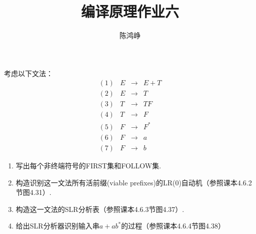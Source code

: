\documentclass[logo,reportComp]{thesis}
\title{编译原理作业六}
\subtitle{}
\author{陈鸿峥}
\begin{document}
\maketitle

\begin{question}
考虑以下文法：
\[\begin{array}{rrll}
(1) & E &\to & E+T\\
(2) & E &\to & T\\
(3) & T &\to & TF\\
(4) & T &\to & F\\
(5) & F &\to & F^*\\
(6) & F &\to & a\\
(7) & F &\to & b
\end{array}\]
\begin{enumerate}
	\item 写出每个非终端符号的FIRST集和FOLLOW集.
	\item 构造识别这一文法所有活前缀(viable prefixes)的LR(0)自动机（参照课本4.6.2节图4.31）.
	\item 构造这一文法的SLR分析表（参照课本4.6.3节图4.37）.
	\item 给出SLR分析器识别输入串$a+ab^*$的过程（参照课本4.6.4节图4.38）
\end{enumerate}
\end{question}
\end{document}
